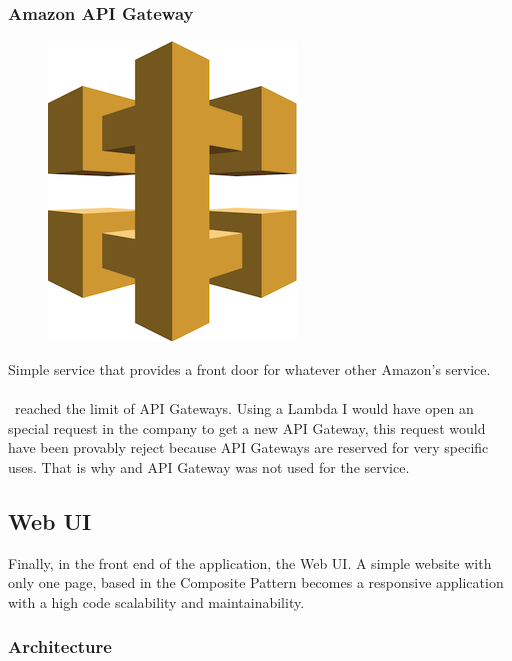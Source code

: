 \subsubsection*{Amazon API Gateway}

\begin{figure}[H]
\includegraphics[scale=0.2]{resources/api-logo.png}
\end{figure}

Simple service that provides a front door for whatever other Amazon's service.
\\\\
\company\ reached the limit of API Gateways\cite{api-gateway}. Using a Lambda I would have open an special request in the company to get a new API Gateway, this request would have been provably reject because API Gateways are reserved for very specific uses. That is why  and API Gateway was not used for the service.

\newpage


\subsection{Web UI} \label{web-ui}

Finally, in the front end of the application, the Web UI. A simple website with only one page, based in the Composite Pattern becomes a responsive application with a high code scalability and maintainability.

\subsubsection*{Architecture}

